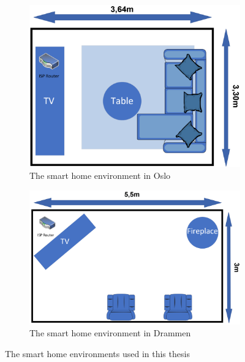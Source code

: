 \begin{figure}[H]
    \centering
    \begin{subfigure}[b]{0.60\textwidth}
        \includegraphics[width=\textwidth]{figures/Environment1.png}
        \caption{The smart home environment in Oslo}
        \label{fig:Environment1}
    \end{subfigure}
    \hfill
    \begin{subfigure}[b]{0.6\textwidth}
        \includegraphics[width=\textwidth]{figures/Environment2.png}
        \caption{The smart home environment in Drammen}
        \label{fig:Environmet2}
    \end{subfigure}
    \caption{The smart home environments used in this thesis}
    \label{fig:SmartHomeEnvironments}
\end{figure}

